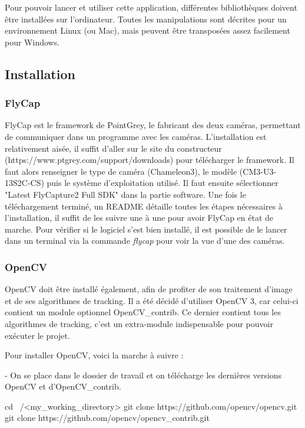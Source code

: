 Pour pouvoir lancer et utiliser cette application, différentes bibliothèques doivent être installées sur l'ordinateur. Toutes les manipulations sont décrites pour un environnement Linux (ou Mac), mais peuvent être transposées assez facilement pour Windows.

\subsection{Installation}

\subsubsection{FlyCap}

FlyCap est le framework de PointGrey, le fabricant des deux caméras, permettant de communiquer dans un programme avec les caméras. L'installation est relativement aisée, il suffit d'aller sur le site du constructeur (https://www.ptgrey.com/support/downloads) pour télécharger le framework. Il faut alors renseigner le type de caméra (Chameleon3), le modèle (CM3-U3-13S2C-CS) puis le système d'exploitation utilisé. Il faut ensuite sélectionner "Latest FlyCapture2 Full SDK" dans la partie software. Une fois le téléchargement terminé, un README détaille toutes les étapes nécessaires à l'installation, il suffit de les suivre une à une pour avoir FlyCap en état de marche. Pour vérifier si le logiciel s'est bien installé, il est possible de le lancer dans un terminal via la commande \textit{flycap} pour voir la vue d'une des caméras.

\subsubsection{OpenCV}

OpenCV doit être installé également, afin de profiter de son traitement d'image et de ses algorithmes de tracking. Il a été décidé d'utiliser OpenCV 3, car celui-ci contient un module optionnel OpenCV_contrib. Ce dernier contient tous les algorithmes de tracking, c'est un extra-module indispensable pour pouvoir exécuter le projet.

Pour installer OpenCV, voici la marche à suivre :

- On se place dans le dossier de travail et on télécharge les dernières versions OpenCV  et d'OpenCV_contrib.

cd ~/<my_working_directory>
git clone https://github.com/opencv/opencv.git
git clone https://github.com/opencv/opencv_contrib.git

